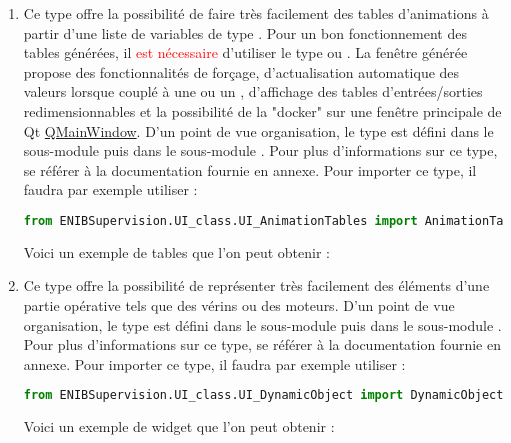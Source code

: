 \begin{enumerate}

\item {}\newline
Ce type offre la possibilité de faire très facilement des tables d'animations à partir d'une liste de variables de type . Pour un bon fonctionnement des tables générées, il \textcolor{red}{est nécessaire} d'utiliser le type  ou .\newline
La fenêtre générée propose des fonctionnalités de forçage, d'actualisation automatique des valeurs lorsque couplé à une  ou un , d'affichage des tables d'entrées/sorties redimensionnables et la possibilité de la "docker" sur une fenêtre principale de Qt \href{https://doc.qt.io/qt-5/qmainwindow.html}{QMainWindow}.\newline
D'un point de vue organisation, le type  est défini dans le sous-module  puis dans le sous-module \newline {}.\newline
Pour plus d'informations sur ce type, se référer à la documentation fournie en annexe.\newline
Pour importer ce type, il faudra par exemple utiliser :
\begin{lstlisting}[language=Python]
from ENIBSupervision.UI_class.UI_AnimationTables import AnimationTables
\end{lstlisting}
Voici un exemple de tables que l'on peut obtenir :


\item {}\newline
Ce type offre la possibilité de représenter très facilement des éléments d'une partie opérative tels que des vérins ou des moteurs.\newline
D'un point de vue organisation, le type  est défini dans le sous-module  puis dans le sous-module \newline {}.\newline
Pour plus d'informations sur ce type, se référer à la documentation fournie en annexe.\newline
Pour importer ce type, il faudra par exemple utiliser :
\begin{lstlisting}[language=Python]
from ENIBSupervision.UI_class.UI_DynamicObject import DynamicObject
\end{lstlisting}
Voici un exemple de widget que l'on peut obtenir :


\end{enumerate}
